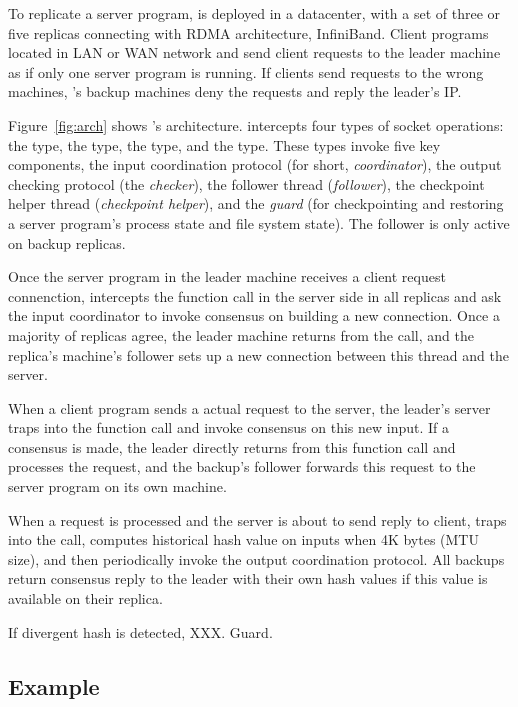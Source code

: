
To replicate a server program, \xxx is deployed in a datacenter, with a set of 
three or five replicas connecting with RDMA architecture, InfiniBand. Client 
programs located in LAN or WAN network and send client requests to the leader 
machine as if only one server program is running. If clients send requests to 
the wrong machines, \xxx's backup machines deny the requests and reply the 
leader's IP.

Figure~\ref{fig:arch} shows \xxx's architecture. \xxx intercepts four types of 
socket operations: the \accept type, the \recv type, the \send type, and the 
\close type. These types invoke five key components, the input coordination 
protocol (for short, \emph{coordinator}), the output checking protocol (the 
\emph{checker}), the follower thread (\emph{follower}), the checkpoint helper 
thread (\emph{checkpoint helper}), and the \emph{guard} (for checkpointing and 
restoring a server program's process state and file system state). The follower 
is only active on backup replicas.

Once the server program in the leader machine receives a client request 
connenction, \xxx intercepts the \accept function call in the server side in 
all replicas and ask the input coordinator to invoke consensus on building a 
new connection. Once a majority of replicas agree, the leader machine returns 
from the \accept call, and the replica's machine's follower sets up a new
connection between this thread and the server.

When a client program sends a actual request to the server, the leader's server 
traps into the \recv function call and invoke consensus on this new input. If 
a consensus is made, the leader directly returns from this function call and 
processes the request, and the backup's follower forwards this request to the 
server program on its own machine.

When a request is processed and the server is about to send reply to client, 
\xxx traps into the \send call, computes historical hash value on inputs when 
4K bytes (MTU size), and then periodically invoke the output coordination 
protocol. All backups return consensus reply to the leader with their own hash 
values if this value is available on their replica.

If divergent hash is detected, XXX. Guard.





\subsection{Example}\label{sec:example}

